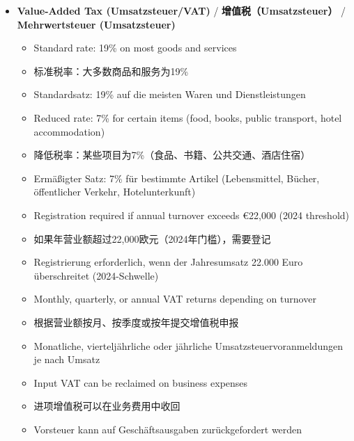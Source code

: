 \begin{itemize}
    \item \textbf{Value-Added Tax (Umsatzsteuer/VAT)} / \textbf{增值税（Umsatzsteuer）} / \textbf{Mehrwertsteuer (Umsatzsteuer)}
    \begin{itemize}
        \item Standard rate: 19\% on most goods and services
        \item 标准税率：大多数商品和服务为19\%
        \item Standardsatz: 19\% auf die meisten Waren und Dienstleistungen
        \item Reduced rate: 7\% for certain items (food, books, public transport, hotel accommodation)
        \item 降低税率：某些项目为7\%（食品、书籍、公共交通、酒店住宿）
        \item Ermäßigter Satz: 7\% für bestimmte Artikel (Lebensmittel, Bücher, öffentlicher Verkehr, Hotelunterkunft)
        \item Registration required if annual turnover exceeds €22,000 (2024 threshold)
        \item 如果年营业额超过22,000欧元（2024年门槛），需要登记
        \item Registrierung erforderlich, wenn der Jahresumsatz 22.000 Euro überschreitet (2024-Schwelle)
        \item Monthly, quarterly, or annual VAT returns depending on turnover
        \item 根据营业额按月、按季度或按年提交增值税申报
        \item Monatliche, vierteljährliche oder jährliche Umsatzsteuervoranmeldungen je nach Umsatz
        \item Input VAT can be reclaimed on business expenses
        \item 进项增值税可以在业务费用中收回
        \item Vorsteuer kann auf Geschäftsausgaben zurückgefordert werden
    \end{itemize}
    

\end{itemize}
